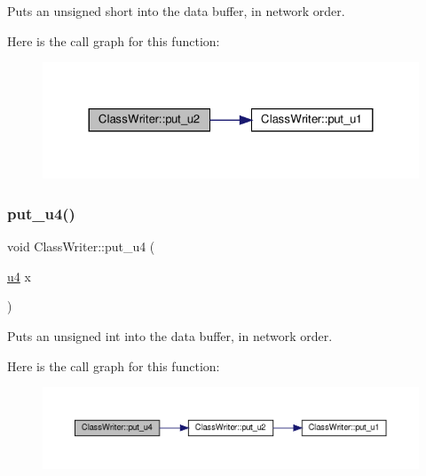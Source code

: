 Puts an unsigned short into the data buffer, in network order. 

Here is the call graph for this function\+:
\nopagebreak
\begin{figure}[H]
\begin{center}
\leavevmode
\includegraphics[width=324pt]{classClassWriter_a0304019dd68dd830fac5c67971ed2070_cgraph}
\end{center}
\end{figure}
\mbox{\label{classClassWriter_aa6a42ab1ec0c2f85c30896506d6dbfce}} 
\subsubsection{\texorpdfstring{put\+\_\+u4()}{put\_u4()}}
{\footnotesize\ttfamily void Class\+Writer\+::put\+\_\+u4 (\begin{DoxyParamCaption}\item[{\hyperlink{types_8h_af3b2d4b29fd9faedc984db3e062b3d5d}{u4}}]{x }\end{DoxyParamCaption})\hspace{0.3cm}{\ttfamily [private]}}



Puts an unsigned int into the data buffer, in network order. 

Here is the call graph for this function\+:
\nopagebreak
\begin{figure}[H]
\begin{center}
\leavevmode
\includegraphics[width=350pt]{classClassWriter_aa6a42ab1ec0c2f85c30896506d6dbfce_cgraph}
\end{center}
\end{figure}
\mbox{\label{classClassWriter_a7be4d13b5665b1e85a8a350ec181951c}} 
